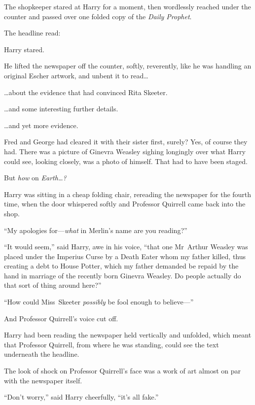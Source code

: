 The shopkeeper stared at Harry for a moment, then wordlessly reached under the counter and passed over one folded copy of the \emph{Daily Prophet}.

The headline read:


Harry stared.

He lifted the newspaper off the counter, softly, reverently, like he was handling an original Escher artwork, and unbent it to read…

…about the evidence that had convinced Rita Skeeter.

…and some interesting further details.

…and yet more evidence.

Fred and George had cleared it with their sister first, surely? Yes, of course they had. There was a picture of Ginevra Weasley sighing longingly over what Harry could see, looking closely, was a photo of himself. That had to have been staged.

But \emph{how} on \emph{Earth…?}

Harry was sitting in a cheap folding chair, rereading the newspaper for the fourth time, when the door whispered softly and Professor Quirrell came back into the shop.

“My apologies for—\emph{what} in Merlin’s name are you reading?”

“It would seem,” said Harry, awe in his voice, “that one Mr~Arthur Weasley was placed under the Imperius Curse by a Death Eater whom my father killed, thus creating a debt to House Potter, which my father demanded be repaid by the hand in marriage of the recently born Ginevra Weasley. Do people actually do that sort of thing around here?”

“How could Miss~Skeeter \emph{possibly} be fool enough to believe—”

And Professor Quirrell’s voice cut off.

Harry had been reading the newspaper held vertically and unfolded, which meant that Professor Quirrell, from where he was standing, could see the text underneath the headline.

The look of shock on Professor Quirrell’s face was a work of art almost on par with the newspaper itself.

“Don’t worry,” said Harry cheerfully, “it’s all fake.”

